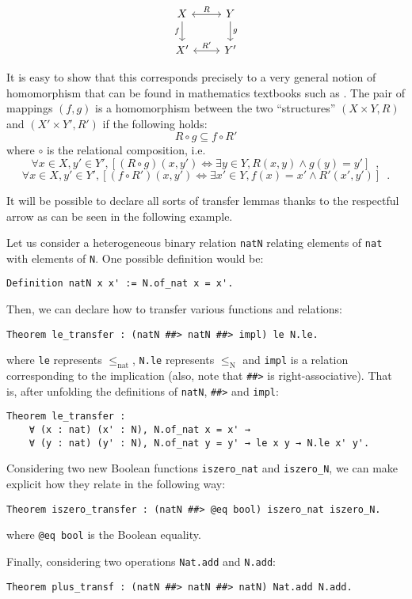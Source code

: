 \documentclass{llncs}
\begin{document}
\[
\begin{tikzcd}
X \arrow[leftrightarrow]{r}{R} \arrow[swap]{d}{f} & Y \arrow{d}{g} \\
X' \arrow[leftrightarrow]{r}{R'} & Y'
\end{tikzcd}
\]

It is easy to show that this corresponds precisely to a very general notion of homomorphism
that can be found in mathematics textbooks such as \cite[Ch. 5.7]{schmidt2011relational}.
The pair of mappings $(f,g)$ is a homomorphism
between the two ``structures'' $(X \times Y,R)$
and $(X' \times Y',R')$ if the following holds:
\[
    R \circ g \subseteq f \circ R'
\]
where $\circ$ is the relational composition, i.e.
\[
\forall x \in X, y' \in Y', \left[
(R \circ g)(x,y') \Leftrightarrow \exists y \in Y, R(x,y) \wedge g(y) = y'
\right] \enspace ,
\]
\[
\forall x \in X, y' \in Y', \left[
(f \circ R')(x,y') \Leftrightarrow \exists x' \in Y, f(x) = x' \wedge R'(x',y')
\right] \enspace .
\]

It will be possible to declare all sorts of transfer lemmas thanks
to the respectful arrow as can be seen in the following example.

\begin{example}
    Let us consider a heterogeneous binary relation \verb|natN| relating
    elements of \verb|nat| with elements of \verb|N|.
    One possible definition would be:
    \begin{verbatim}Definition natN x x' := N.of_nat x = x'.\end{verbatim}
    Then, we can declare how to transfer various functions and relations:
    \begin{verbatim}Theorem le_transfer : (natN ##> natN ##> impl) le N.le.\end{verbatim}
    where \verb|le| represents $\leq_{\mathrm{nat}}$,
    \verb|N.le| represents $\leq_{\mathrm{N}}$ and \verb|impl|
    is a relation corresponding to the implication (also, note that
    \verb|##>| is right-associative).
    That is, after unfolding the definitions of
    \verb|natN|, \verb|##>| and \verb|impl|:
    \begin{verbatim}Theorem le_transfer :
    ∀ (x : nat) (x' : N), N.of_nat x = x' →
    ∀ (y : nat) (y' : N), N.of_nat y = y' → le x y → N.le x' y'.\end{verbatim}

    Considering two new Boolean functions \verb|iszero_nat| and \verb|iszero_N|,
    we can make explicit how they relate in the following way:
    \begin{verbatim}Theorem iszero_transfer : (natN ##> @eq bool) iszero_nat iszero_N.\end{verbatim}
    where \verb+@eq bool+ is the Boolean equality.

    Finally, considering two operations \verb|Nat.add| and \verb|N.add|:
    \begin{verbatim}Theorem plus_transf : (natN ##> natN ##> natN) Nat.add N.add.\end{verbatim}
\end{example}
\end{document}

